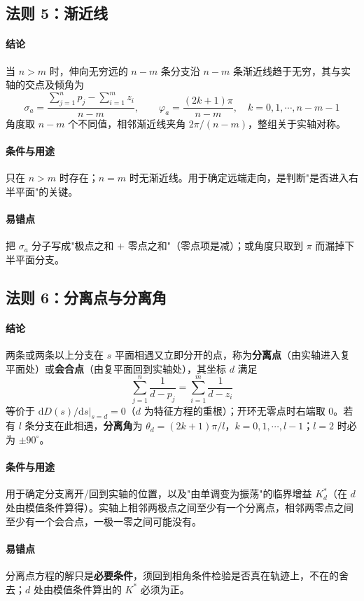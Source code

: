 \subsection{法则 5：渐近线}
\paragraph{结论}当 $n>m$ 时，伸向无穷远的 $n-m$ 条分支沿 $n-m$ 条渐近线趋于无穷，其与实轴的交点及倾角为
\[
\sigma_a=\frac{\sum_{j=1}^{n}p_j-\sum_{i=1}^{m}z_i}{n-m},
\qquad
\varphi_a=\frac{(2k+1)\pi}{n-m},\quad k=0,1,\cdots,n-m-1
\]
角度取 $n-m$ 个不同值，相邻渐近线夹角 $2\pi/(n-m)$，整组关于实轴对称。

\paragraph{条件与用途}只在 $n>m$ 时存在；$n=m$ 时无渐近线。用于确定远端走向，是判断"是否进入右半平面"的关键。

\paragraph{易错点}把 $\sigma_a$ 分子写成"极点之和 $+$ 零点之和"（零点项是减）；或角度只取到 $\pi$ 而漏掉下半平面分支。

\subsection{法则 6：分离点与分离角}
\paragraph{结论}两条或两条以上分支在 $s$ 平面相遇又立即分开的点，称为\textbf{分离点}（由实轴进入复平面处）或\textbf{会合点}（由复平面回到实轴处），其坐标 $d$ 满足
\[
\sum_{j=1}^{n}\frac{1}{d-p_j}=\sum_{i=1}^{m}\frac{1}{d-z_i}
\]
等价于 $\left.\mathrm{d}D(s)/\mathrm{d}s\right|_{s=d}=0$（$d$ 为特征方程的重根）；开环无零点时右端取 $0$。若有 $l$ 条分支在此相遇，\textbf{分离角}为 $\theta_d=(2k+1)\pi/l$，$k=0,1,\cdots,l-1$；$l=2$ 时必为 $\pm90^\circ$。

\paragraph{条件与用途}用于确定分支离开/回到实轴的位置，以及"由单调变为振荡"的临界增益 $K^*_d$（在 $d$ 处由模值条件算得）。实轴上相邻两极点之间至少有一个分离点，相邻两零点之间至少有一个会合点，一极一零之间可能没有。

\paragraph{易错点}分离点方程的解只是\textbf{必要条件}，须回到相角条件检验是否真在轨迹上，不在的舍去；$d$ 处由模值条件算出的 $K^*$ 必须为正。

